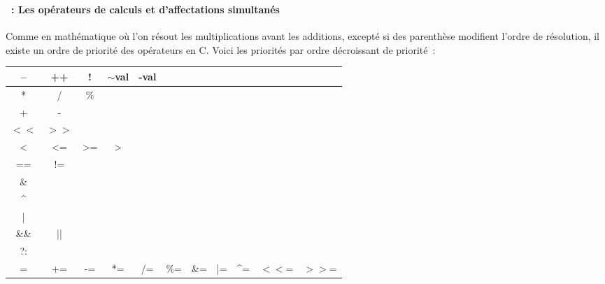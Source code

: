 \begin{frame}[containsverbatim]
  \frametitle{\secname}
  \framesubtitle{\subsecname~: Les opérateurs de calculs et d'affectations simultanés} 

  Comme en mathématique où l'on résout les multiplications avant les additions, excepté si des parenthèse modifient l'ordre de résolution, il existe un ordre de priorité
  des opérateurs en C. Voici les priorités par ordre décroissant de priorité~:
  \begin{center}
    {\footnotesize\begin{tabular}{|c|c|c|c|c|c|c|c|c|c|c|}
      \hline
      -- & ++ & ! & $\sim$val & -val & & & & & &  \\
      \hline
      * & / & \% &  &  &  &  &  &  &  &  \\
      \hline
      + & - &  &  &  &  &  &  &  &  &  \\
      \hline
      $<<$ & $>>$ &  &  &  &  &  &  &  &  &  \\
      \hline
      < & <= & >= & > &  &  &  &  &  &  &  \\
      \hline
      == & != &  &  &  &  &  &  &  &  &  \\
      \hline
      \& &  &  &  &  &  &  &  &  &  &  \\
      \hline
      \^{ } &  &  &  &  &  &  &  &  &  &  \\
      \hline
      | &  &  &  &  &  &  &  &  &  &  \\
      \hline
      \&\& & || &  &  &  &  &  &  &  &  &  \\
      \hline
      ?: &  &  &  &  &  &  &  &  &  &  \\
      \hline
      = & += & -= & *= & /= & \%= & \&= & |= & \^{ }= & $<<$= & $>>$= \\
      \hline
    \end{tabular}}
  \end{center}
\end{frame}

